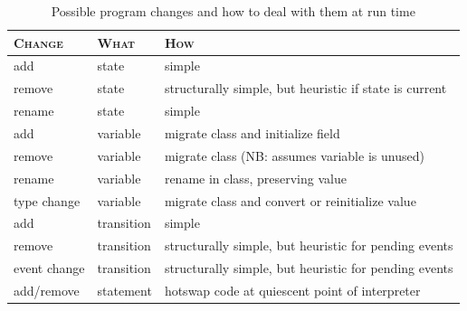 \documentclass[english,submission]{programming}
\begin{document}
\begin{table}[t]
  \centering
\begin{tabular}{lll}\toprule
\textsc{Change} & \textsc{What} & \textsc{How}\\\midrule
add & state & simple  \\
remove & state & structurally simple, but heuristic if state is current \\
rename & state & simple\\
add & variable & migrate class and initialize field \\
remove & variable & migrate class (NB: assumes variable is unused)\\
rename & variable & rename in class, preserving value\\
type change & variable & migrate class and convert or reinitialize value \\
add & transition & simple \\
remove & transition & structurally simple, but heuristic for pending events\\
event change & transition & structurally simple, but heuristic for pending events\\
add/remove & statement & hotswap code at quiescent point of interpreter\\
\bottomrule
\end{tabular}
\caption{Possible program changes and how to deal with them at run time}
\label{tbl:smchanges}
\end{table}
\end{document}
